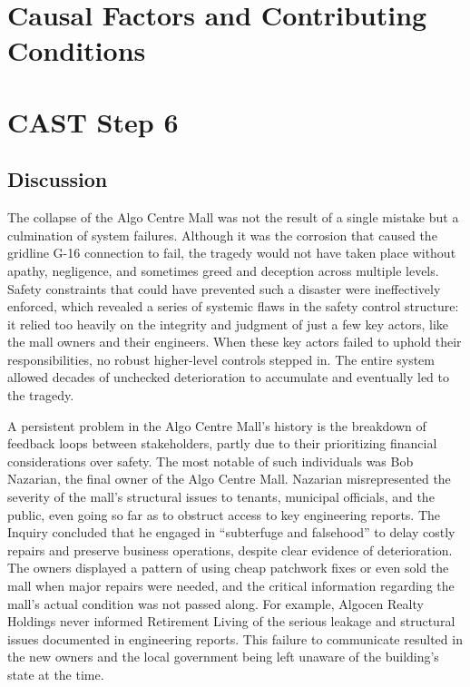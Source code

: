 \documentclass[12pt]{article}
\begin{document}
\section{Causal Factors and Contributing Conditions}



\section{CAST Step 6}

\subsection{Discussion}

The collapse of the Algo Centre Mall was not the result of a single mistake but a culmination of system failures. Although it was the corrosion that caused the gridline G-16 connection to fail, the tragedy would not have taken place without apathy, negligence, and sometimes greed and deception across multiple levels. Safety constraints that could have prevented such a disaster were ineffectively enforced, which revealed a series of systemic flaws in the safety control structure: it relied too heavily on the integrity and judgment of just a few key actors, like the mall owners and their engineers. When these key actors failed to uphold their responsibilities, no robust higher-level controls stepped in. The entire system allowed decades of unchecked deterioration to accumulate and eventually led to the tragedy.

A persistent problem in the Algo Centre Mall's history is the breakdown of feedback loops between stakeholders, partly due to their prioritizing financial considerations over safety. The most notable of such individuals was Bob Nazarian, the final owner of the Algo Centre Mall. Nazarian misrepresented the severity of the mall's structural issues to tenants, municipal officials, and the public, even going so far as to obstruct access to key engineering reports. The Inquiry concluded that he engaged in “subterfuge and falsehood” to delay costly repairs and preserve business operations, despite clear evidence of deterioration. The owners displayed a pattern of using cheap patchwork fixes or even sold the mall when major repairs were needed, and the critical information regarding the mall's actual condition was not passed along. For example, Algocen Realty Holdings never informed Retirement Living of the serious leakage and structural issues documented in engineering reports. This failure to communicate resulted in the new owners and the local government being left unaware of the building's state at the time. 
\end{document}

